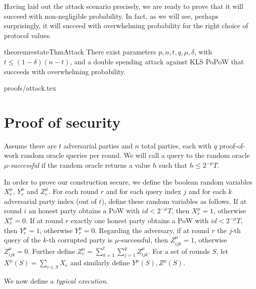 Having laid out the attack scenario precisely, we are ready to prove that it
will succeed with non-negligible probability. In fact, as we will see, perhaps
surprisingly, it will succeed with overwhelming probability for the right choice
of protocol values.

\begin{restatable}{theorem}{restateThmAttack}
There exist parameters $p, n, t, q,  \mu, \delta$, with $t\leq (1-\delta)(n-t)$,
and a double spending attack against KLS PoPoW that succeeds with overwhelming
probability.
\end{restatable}
\ifonecolumn
{proofs/attack.tex}
\fi

\section{Proof of security}
Assume there are $t$ adversarial parties and $n$ total parties, each with $q$
proof-of-work random oracle queries per round. We will call a query to the
random oracle $\mu$-\textit{successful} if the random oracle returns a value $h$
such that $h \leq 2^{-\mu}T$.

In order to prove our construction secure, we define the boolean random
variables $X_r^\mu$, $Y_r^\mu$ and $Z_r^\mu$. For each round $r$ and for each
query index $j$ and for each $k$ adversarial party index (out of $t$), define
these random variables as follows. If at round $i$ an honest party obtains a
PoW with $id < 2^{-\mu}T$, then $X_r^\mu = 1$, otherwise $X_r^\mu = 0$. If at
round $r$ exactly one honest party obtains a PoW with $id < 2^{-\mu}T$, then
$Y_r^\mu = 1$, otherwise $Y_r^\mu = 0$. Regarding the adversary, if at round $r$
the $j$-th query of the $k$-th corrupted party is $\mu$-successful, then
$Z^\mu_{ijk} = 1$, otherwise $Z^\mu_{ijk} = 0$. Further define $Z^\mu_r =
\sum_{k=1}^t \sum_{j=1}^q Z^\mu_{ijk}$. For a set of rounds $S$, let $X^\mu(S) =
\sum_{r \in S} X_r$ and similarly define $Y^\mu(S), Z^\mu(S)$.

We now define a \textit{typical execution}.

